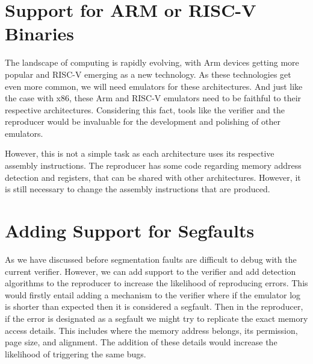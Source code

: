 \section{Support for ARM or RISC-V Binaries}
The landscape of computing is rapidly evolving, with Arm devices getting more popular and RISC-V emerging as a new technology.
As these technologies get even more common, we will need emulators for these architectures.
And just like the case with x86, these Arm and RISC-V emulators need to be faithful to their respective architectures.
Considering this fact, tools like the verifier and the reproducer would be invaluable for the development and polishing of other emulators.

However, this is not a simple task as each architecture uses its respective assembly instructions.
The reproducer has some code regarding memory address detection and registers, that can be shared with other architectures.
However, it is still necessary to change the assembly instructions that are produced.

\section{Adding Support for Segfaults}
As we have discussed before segmentation faults are difficult to debug with the current verifier.
However, we can add support to the verifier and add detection algorithms to the reproducer to increase the likelihood of reproducing errors.
This would firstly entail adding a mechanism to the verifier where if the emulator log is shorter than expected then it is considered a \ac{segfault}.
Then in the reproducer, if the error is designated as a \ac{segfault} we might try to replicate the exact memory access details.
This includes where the memory address belongs, its permission, page size, and alignment.
The addition of these details would increase the likelihood of triggering the same bugs.
